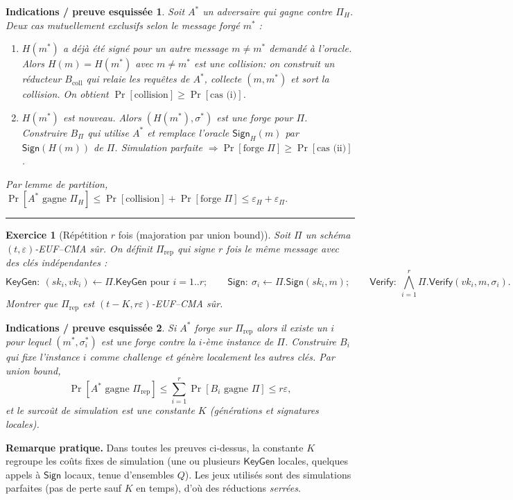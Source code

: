 \documentclass[11pt,a4paper]{article}
\newtheorem{exo}{Exercice}
\newtheorem*{sol}{Indications / preuve esquissée}
\newcommand{\KeyGen}{\mathsf{KeyGen}}
\newcommand{\Sign}{\mathsf{Sign}}
\newcommand{\Verify}{\mathsf{Verify}}
\begin{document}
\begin{sol}
Soit $A^\ast$ un adversaire qui gagne contre $\Pi_H$. Deux cas mutuellement exclusifs selon le message forg\'e $m^\ast$ :
\begin{enumerate}[label=(\roman*)]
\item $H(m^\ast)$ a d\'ej\`a \'et\'e sign\'e pour un autre message $m\neq m^\ast$ demand\'e \`a l'oracle. Alors $H(m)=H(m^\ast)$ avec $m\neq m^\ast$ est une collision: on construit un r\'educteur $B_{\text{coll}}$ qui relaie les requ\^etes de $A^\ast$, collecte $(m,m^\ast)$ et sort la collision. On obtient $\Pr[\text{collision}] \ge \Pr[\text{cas (i)}]$.
\item $H(m^\ast)$ est \emph{nouveau}. Alors $(H(m^\ast),\sigma^\ast)$ est une forge pour $\Pi$. Construire $B_{\Pi}$ qui utilise $A^\ast$ et remplace l'oracle $\Sign_H(m)$ par $\Sign(H(m))$ de $\Pi$. Simulation parfaite $\Rightarrow \Pr[\text{forge }\Pi]\ge \Pr[\text{cas (ii)}]$.
\end{enumerate}
Par lemme de partition,
\(
\Pr[A^\ast\text{ gagne } \Pi_H]
\le \Pr[\text{collision}] + \Pr[\text{forge }\Pi]
\le \varepsilon_H + \varepsilon_\Pi.
\)
\end{sol}

\vspace{1ex}\hrule\vspace{1ex}

\begin{exo}[R\'ep\'etition $r$ fois (majoration par union bound)]
Soit $\Pi$ un sch\'ema $(t,\varepsilon)$-EUF--CMA s\^ur. On d\'efinit $\Pi_{\text{rep}}$ qui signe $r$ fois le m\^eme message avec des cl\'es ind\'ependantes :
\[
\KeyGen:~(sk_i,vk_i)\leftarrow \Pi.\KeyGen \text{ pour } i=1..r;\qquad
\Sign:~\sigma_i\leftarrow \Pi.\Sign(sk_i,m);\qquad
\Verify:~\bigwedge_{i=1}^r \Pi.\Verify(vk_i,m,\sigma_i).
\]
Montrer que $\Pi_{\text{rep}}$ est $(t-K,r\varepsilon)$-EUF--CMA s\^ur.
\end{exo}

\begin{sol}
Si $A^\ast$ forge sur $\Pi_{\text{rep}}$ alors il existe un $i$ pour lequel $(m^\ast,\sigma_i^\ast)$ est une forge contre la $i$-\`eme instance de $\Pi$. Construire $B_i$ qui fixe l'instance $i$ comme challenge et g\'en\`ere localement les autres cl\'es. Par union bound,
\[
\Pr[A^\ast \text{ gagne } \Pi_{\text{rep}}]
\le \sum_{i=1}^r \Pr[B_i \text{ gagne } \Pi] \le r\varepsilon,
\]
et le surco\^ut de simulation est une constante $K$ (g\'en\'erations et signatures locales).
\end{sol}

\bigskip
\noindent\textbf{Remarque pratique.}
Dans toutes les preuves ci-dessus, la constante $K$ regroupe les co\^uts fixes de simulation (une ou plusieurs $\KeyGen$ locales, quelques appels \`a $\Sign$ locaux, tenue d'ensembles $Q$). Les jeux utilis\'es sont des simulations parfaites (pas de perte sauf $K$ en temps), d'o\`u des r\'eductions \emph{serr\'ees}.
\end{document}
